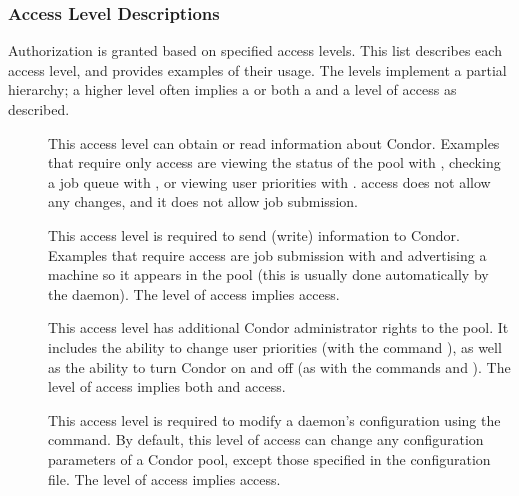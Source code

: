 \subsubsection{\label{sec:Security-access-levels}Access Level Descriptions}
Authorization is granted based on specified access levels.
This list describes each access level,
and provides examples of their usage.
The levels implement a partial hierarchy;  a higher level often implies
a  or both a 
 and a  level of access as described.

\begin{description}

\item[] \label{sec-level-read} This access level
   can obtain or read information about Condor.
   Examples that require only  access are
   viewing the status of the pool with , 
   checking a job queue with ,
   or viewing user priorities with .
    access does not allow any
   changes, and it does not allow job submission.

\item[] \label{sec-level-write} This access level is
   required to send (write) information to Condor. Examples that
   require  access are job submission with
    and advertising a machine so it appears in the pool
   (this is usually done automatically by the  daemon).
   The  level of access implies  access. 

\item[] \label{sec-level-administrator} This
   access level has additional Condor
   administrator rights to the pool.  It includes the ability to
   change user priorities (with the command ),
   as well as the ability to turn Condor on and off
   (as with the commands  and ).
   The  level of access implies both
    and  access.

\item[] \label{sec-level-config} This access level is
   required to modify a daemon's configuration using
   the  command.
   By default, this level of access can
   change any configuration parameters of a Condor pool,
   except those specified in
   the  configuration file.
   The  level of access implies  access. 


\end{description}
